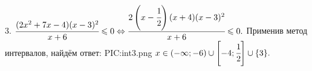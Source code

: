 3. $\cfrac{(2x^2+7x-4)(x-3)^2}{x+6}\leqslant0\Leftrightarrow\cfrac{2\left(x-\cfrac{1}{2}\right)(x+4)(x-3)^2}{x+6}\leqslant0.$ Применив метод интервалов, найдём ответ:
{{PIC:int3.png}}
$x\in(-\infty; -6)\cup\left[-4;\cfrac{1}{2}\right]\cup\{3\}.$\\
